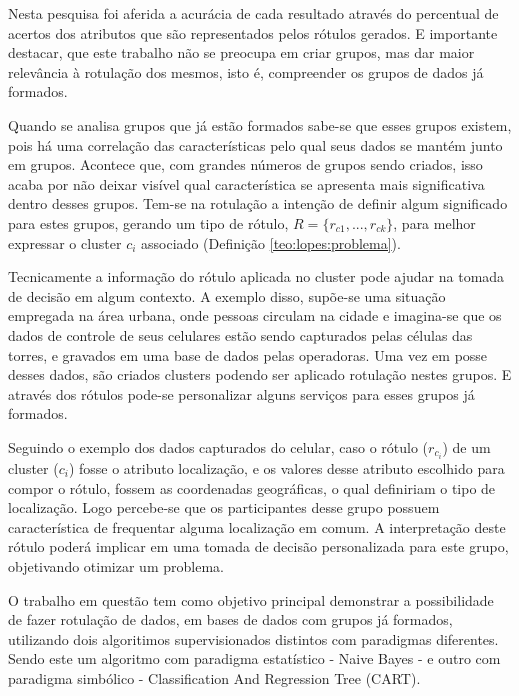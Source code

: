 Nesta pesquisa foi aferida a acurácia de cada resultado através do percentual de acertos dos atributos que são representados pelos rótulos gerados. E importante destacar, que este trabalho não se preocupa em criar grupos, mas dar maior relevância à rotulação dos mesmos, isto é, compreender os grupos de dados já formados.

Quando se analisa grupos que já estão formados sabe-se que esses grupos existem, pois há uma correlação das características pelo qual seus dados se mantém junto em grupos. Acontece que, com grandes números de grupos sendo criados, isso acaba por não deixar visível qual característica se apresenta mais significativa dentro desses grupos. Tem-se na rotulação a intenção de definir algum significado para estes grupos, gerando um tipo de rótulo, ${ R=\{ r_{c1},...,r_{ck} \} }$, para melhor expressar o cluster ${c_i}$ associado (Definição \ref{teo:lopes:problema}).

Tecnicamente a informação do rótulo aplicada no cluster pode ajudar na tomada de decisão em algum contexto. A exemplo disso, supõe-se uma situação empregada na área urbana, onde pessoas circulam na cidade e imagina-se que os dados de controle de seus celulares estão sendo capturados pelas células das torres, e gravados em uma base de dados pelas operadoras. Uma vez em posse desses dados, são criados clusters podendo ser aplicado rotulação nestes grupos. E através dos rótulos pode-se personalizar alguns serviços para esses grupos já formados. 

Seguindo o exemplo dos dados capturados do celular, caso o rótulo (${r_{c_i}}$) de um cluster (${c_i}$) fosse o  atributo localização, e os valores  desse atributo escolhido para compor o rótulo, fossem as coordenadas geográficas, o qual definiriam o tipo de localização. Logo percebe-se que os participantes desse grupo possuem característica de frequentar alguma localização em comum. A interpretação deste rótulo poderá implicar em uma tomada de decisão personalizada para este grupo, objetivando otimizar um problema.

O trabalho em questão tem como objetivo principal demonstrar a  possibilidade de fazer rotulação de dados, em bases de dados com grupos já formados, utilizando dois algoritimos supervisionados distintos com paradigmas diferentes. Sendo este um algoritmo com paradigma estatístico - Naive Bayes -  e outro com paradigma simbólico - Classification And Regression Tree (CART).
 

